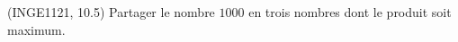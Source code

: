 
\begin{exercice}\label{exoDerrivePartielle-0008}

	(INGE1121, 10.5) Partager le nombre $1000$ en trois nombres dont le produit soit maximum.

\end{exercice}
